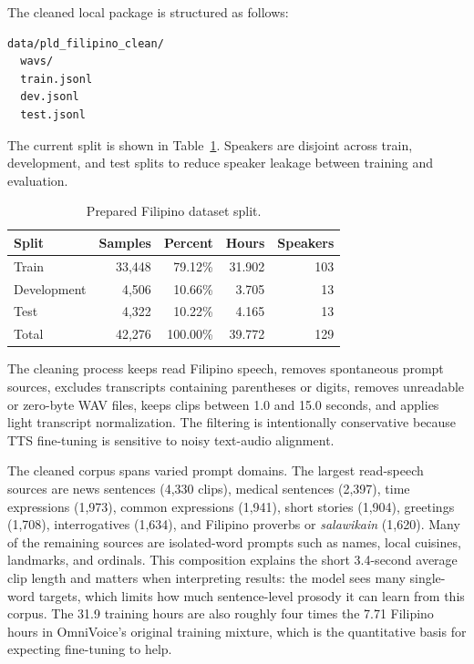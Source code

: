 \documentclass[11pt]{article}
\begin{document}
The cleaned local package is structured as follows:

\begin{verbatim}
data/pld_filipino_clean/
  wavs/
  train.jsonl
  dev.jsonl
  test.jsonl
\end{verbatim}

The current split is shown in Table~\ref{tab:clean-split}. Speakers are disjoint across train, development, and test splits to reduce speaker leakage between training and evaluation.

\begin{table}[H]
  \centering
  \caption{Prepared Filipino dataset split.}
  \begin{tabular}{lrrrr}
    \toprule
    Split & Samples & Percent & Hours & Speakers \\
    \midrule
    Train & 33,448 & 79.12\% & 31.902 & 103 \\
    Development & 4,506 & 10.66\% & 3.705 & 13 \\
    Test & 4,322 & 10.22\% & 4.165 & 13 \\
    Total & 42,276 & 100.00\% & 39.772 & 129 \\
    \bottomrule
  \end{tabular}
  \label{tab:clean-split}
\end{table}

The cleaning process keeps read Filipino speech, removes spontaneous prompt sources, excludes transcripts containing parentheses or digits, removes unreadable or zero-byte WAV files, keeps clips between 1.0 and 15.0 seconds, and applies light transcript normalization. The filtering is intentionally conservative because TTS fine-tuning is sensitive to noisy text-audio alignment.

The cleaned corpus spans varied prompt domains. The largest read-speech sources are news sentences (4,330 clips), medical sentences (2,397), time expressions (1,973), common expressions (1,941), short stories (1,904), greetings (1,708), interrogatives (1,634), and Filipino proverbs or \textit{salawikain} (1,620). Many of the remaining sources are isolated-word prompts such as names, local cuisines, landmarks, and ordinals. This composition explains the short 3.4-second average clip length and matters when interpreting results: the model sees many single-word targets, which limits how much sentence-level prosody it can learn from this corpus. The 31.9 training hours are also roughly four times the 7.71 Filipino hours in OmniVoice's original training mixture, which is the quantitative basis for expecting fine-tuning to help.
\end{document}
